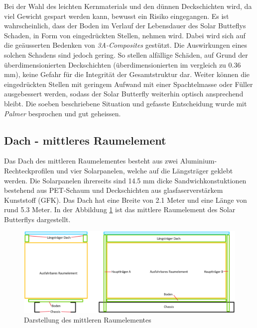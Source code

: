 Bei der Wahl des leichten Kernmaterials und den dünnen Deckschichten wird, da viel Gewicht gespart werden kann, bewusst ein Risiko eingegangen. Es ist wahrscheinlich, dass der Boden im Verlauf der Lebensdauer des Solar Butteflys Schaden, in Form von eingedrückten Stellen, nehmen wird. Dabei wird sich auf die geäusserten Bedenken von \emph{3A-Composites} gestützt. Die Auswirkungen eines solchen Schadens sind jedoch gering. So stellen alfällige Schäden, auf Grund der überdimensionierten Deckschichten (überdimensionierten im vergleich zu 0.36 mm), keine Gefahr für die Integrität der Gesamtstruktur dar. Weiter können die eingedrückten Stellen mit geringem Aufwand mit einer Spachtelmasse oder Füller ausgebessert werden, sodass der Solar Butterfly weiterhin optisch ansprechend bleibt. Die soeben beschriebene Situation und gefasste Entscheidung wurde mit \emph{Palmer} besprochen und gut geheissen.


\subsection{Dach - mittleres Raumelement}
\label{Dach}
Das Dach des mittleren Raumelementes besteht aus zwei Aluminium-Rechteckprofilen und vier Solarpanelen, welche auf die Längsträger geklebt werden. Die Solarpanelen ihrerseits sind 14.5 mm dicke Sandwichkonstuktionen bestehend aus PET-Schaum und Deckschichten aus glasfaserverstärkem Kunststoff (GFK). Das Dach hat eine Breite von 2.1 Meter und eine Länge von rund 5.3 Meter. In der Abbildung \ref{img:Dach} ist das mittlere Raumelement des Solar Butterflys dargestellt.\\

\begin{figure}[h]
  \includegraphics[width=\linewidth]{04_Figures/Dach.png}
  \caption{Darstellung des mittleren Raumelementes}
  \label{img:Dach}
\end{figure}

